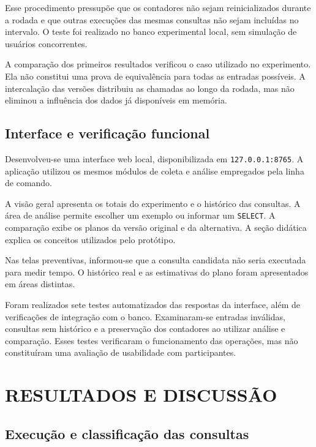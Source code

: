 \documentclass{UNESC}
\newcommand{\codigo}[1]{\texttt{#1}}
\begin{document}
Esse procedimento pressupõe que os contadores não sejam reinicializados durante a rodada e que outras execuções das mesmas consultas não sejam incluídas no intervalo. O teste foi realizado no banco experimental local, sem simulação de usuários concorrentes.

A comparação dos primeiros resultados verificou o caso utilizado no experimento. Ela não constitui uma prova de equivalência para todas as entradas possíveis. A intercalação das versões distribuiu as chamadas ao longo da rodada, mas não eliminou a influência dos dados já disponíveis em memória.

\subsection{Interface e verificação funcional}

Desenvolveu-se uma interface web local, disponibilizada em \codigo{127.0.0.1:8765}. A aplicação utilizou os mesmos módulos de coleta e análise empregados pela linha de comando.

A visão geral apresenta os totais do experimento e o histórico das consultas. A área de análise permite escolher um exemplo ou informar um \codigo{SELECT}. A comparação exibe os planos da versão original e da alternativa. A seção didática explica os conceitos utilizados pelo protótipo.

Nas telas preventivas, informou-se que a consulta candidata não seria executada para medir tempo. O histórico real e as estimativas do plano foram apresentados em áreas distintas.

Foram realizados sete testes automatizados das respostas da interface, além de verificações de integração com o banco. Examinaram-se entradas inválidas, consultas sem histórico e a preservação dos contadores ao utilizar análise e comparação. Esses testes verificaram o funcionamento das operações, mas não constituíram uma avaliação de usabilidade com participantes.


\section{RESULTADOS E DISCUSSÃO}

\subsection{Execução e classificação das consultas}
\end{document}
